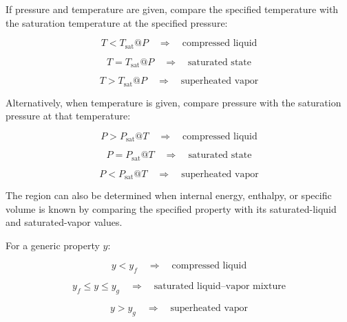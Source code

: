 \documentclass[12pt]{article}
\begin{document}
If pressure and temperature are given, compare the specified temperature with the saturation temperature at the specified pressure:

\begin{equation*}
\boxed{
T<T_{\mathrm{sat}}@P
\quad\Rightarrow\quad
\text{compressed liquid}
}
\end{equation*}

\begin{equation*}
\boxed{
T=T_{\mathrm{sat}}@P
\quad\Rightarrow\quad
\text{saturated state}
}
\end{equation*}

\begin{equation*}
\boxed{
T>T_{\mathrm{sat}}@P
\quad\Rightarrow\quad
\text{superheated vapor}
}
\end{equation*}

Alternatively, when temperature is given, compare pressure with the saturation pressure at that temperature:

\begin{equation*}
\boxed{
P>P_{\mathrm{sat}}@T
\quad\Rightarrow\quad
\text{compressed liquid}
}
\end{equation*}

\begin{equation*}
\boxed{
P=P_{\mathrm{sat}}@T
\quad\Rightarrow\quad
\text{saturated state}
}
\end{equation*}

\begin{equation*}
\boxed{
P<P_{\mathrm{sat}}@T
\quad\Rightarrow\quad
\text{superheated vapor}
}
\end{equation*}

The region can also be determined when internal energy, enthalpy, or specific volume is known by comparing the specified property with its saturated-liquid and saturated-vapor values.

For a generic property $y$:

\begin{equation*}
\boxed{
y<y_f
\quad\Rightarrow\quad
\text{compressed liquid}
}
\end{equation*}

\begin{equation*}
\boxed{
y_f\leq y\leq y_g
\quad\Rightarrow\quad
\text{saturated liquid--vapor mixture}
}
\end{equation*}

\begin{equation*}
\boxed{
y>y_g
\quad\Rightarrow\quad
\text{superheated vapor}
}
\end{equation*}
\end{document}
